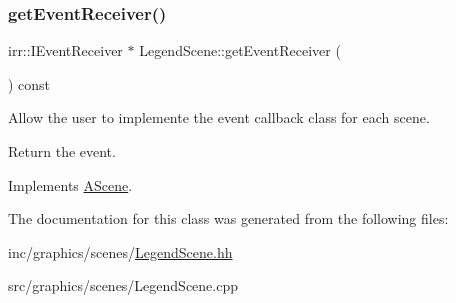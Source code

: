 \subsubsection{\texorpdfstring{get\+Event\+Receiver()}{getEventReceiver()}}
{\footnotesize\ttfamily irr\+::\+I\+Event\+Receiver $\ast$ Legend\+Scene\+::get\+Event\+Receiver (\begin{DoxyParamCaption}{ }\end{DoxyParamCaption}) const\hspace{0.3cm}{\ttfamily [virtual]}}



Allow the user to implemente the event callback class for each scene. 

Return the event. 

Implements \hyperlink{classAScene_af521e5e6d30a5d2e5d30eb333e4d3abd}{A\+Scene}.



The documentation for this class was generated from the following files\+:\begin{DoxyCompactItemize}
\item 
inc/graphics/scenes/\hyperlink{LegendScene_8hh}{Legend\+Scene.\+hh}\item 
src/graphics/scenes/Legend\+Scene.\+cpp\end{DoxyCompactItemize}
